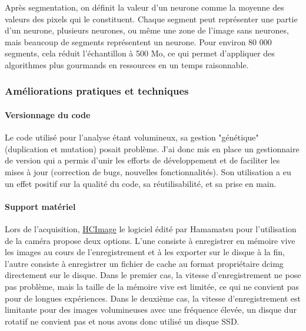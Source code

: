 Après segmentation, on définit la valeur d'un neurone comme la moyenne des valeurs des pixels qui le constituent. Chaque segment peut représenter une partie d'un neurone, plusieurs neurones, ou même une zone de l'image sans neurones, mais beaucoup de segments représentent un neurone. Pour environ 80 000 segments, cela réduit l'échantillon à 500 Mo, ce qui permet d'appliquer des algorithmes plus gourmands en ressources en un temps raisonnable.




\subsubsection{Améliorations pratiques et techniques}

\paragraph{Versionnage du code}
Le code utilisé pour l'analyse étant volumineux, sa gestion "génétique" (duplication et mutation) posait problème. J'ai donc mis en place un gestionnaire de version qui a permis d'unir les efforts de développement et de faciliter les mises à jour (correction de bugs, nouvelles fonctionnalités). Son utilisation a eu un effet positif sur la qualité du code, sa réutilisabilité, et sa prise en main. 

\paragraph{Support matériel}
Lors de l'acquisition, \href{https://hcimage.com/}{HCImage} le logiciel édité par Hamamatsu pour l'utilisation de la caméra propose deux options. L'une consiste à enregistrer en mémoire vive les images au cours de l'enregistrement et à les exporter sur le disque à la fin, l'autre consiste à enregistrer un fichier de cache au format propriétaire dcimg directement sur le disque. Dans le premier cas, la vitesse d'enregistrement ne pose pas problème, mais la taille de la mémoire vive est limitée, ce qui ne convient pas pour de longues expériences. Dans le deuxième cas, la vitesse d'enregistrement est limitante pour des images volumineuses avec une fréquence élevée, un disque dur rotatif ne convient pas et nous avons donc utilisé un disque SSD.

